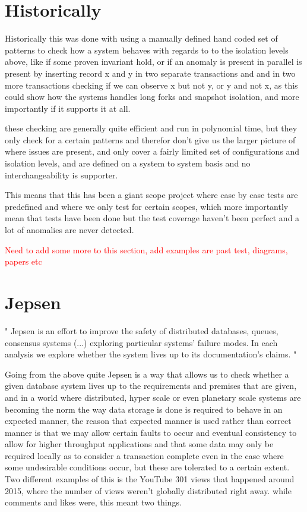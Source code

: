 \documentclass[a4paper,10pt,titlepage]{report}
\begin{document}
\section{Historically}

Historically this was done with using a manually defined hand coded set of patterns to check how a system behaves with regards to to the isolation levels above, like if some proven invariant hold, or if an anomaly is present in parallel is present by inserting record x and y in two separate transactions and and in two more transactions checking if we can observe x but not y, or y and not x, as this could show how the systems handles long forks and snapshot isolation, and more importantly if it supports it at all.

these checking are generally quite efficient and run in polynomial time, but they only check for a certain patterns and therefor don't give us the larger picture of where issues are present, and only cover a fairly limited set of configurations and isolation levels, and are defined on a system to system basis and no interchangeability is supporter.

This means that this has been a giant scope project where case by case tests are predefined and where we only test for certain scopes, which more importantly mean that tests have been done but the test coverage haven't been perfect and a lot of anomalies are never detected.

\textcolor{red}{Need to add some more to this section, add examples are past test, diagrams, papers etc}

\section{Jepsen}
"
Jepsen is an effort to improve the safety of distributed databases, queues, consensus systems  (...) exploring particular systems’ failure modes. In each analysis we explore whether the system lives up to its documentation’s claims.
"\cite{jepsonio}
\\
\vspace{5mm}

Going from the above quite Jepsen is a way that allows us to check whether a given database system lives up to the requirements and premises that are given, and in a world where distributed, hyper scale or even planetary scale systems are becoming the norm the way data storage is done is required to behave in an expected manner, the reason that expected manner is used rather than correct manner is that we may allow certain faults to occur and eventual consistency to allow for higher throughput applications and that some data may only be required locally as to consider a transaction complete even in the case where some undesirable conditions occur, but these are tolerated to a certain extent. \\
\vspace{5mm}
Two different examples of this is the YouTube 301 views that happened around 2015, where the number of views weren't globally distributed right away. while comments and likes were, this meant two things. \\
\end{document}
